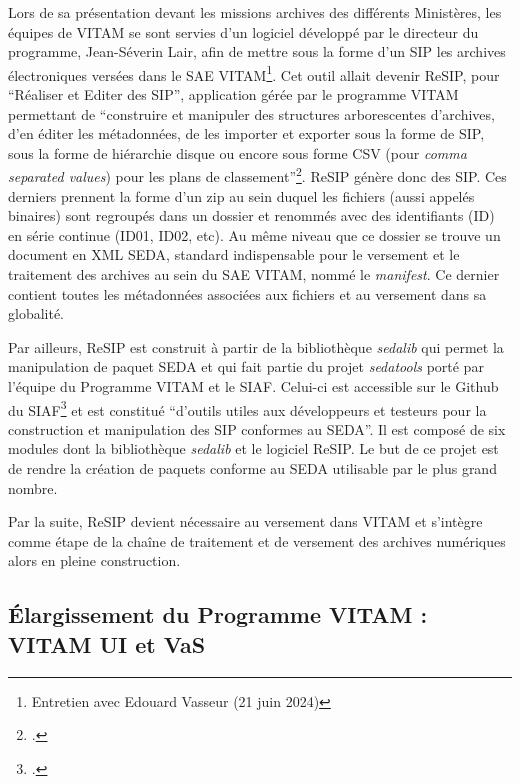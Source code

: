 Lors de sa présentation devant les missions archives des différents Ministères, les équipes de \gls{VITAM} se sont servies d’un logiciel développé par le directeur du programme, Jean-Séverin Lair, afin de mettre sous la forme d’un \gls{SIP} les archives électroniques versées dans le \gls{SAE} \gls{VITAM}\footnote{Entretien avec Edouard Vasseur (21 juin 2024)}. Cet outil allait devenir ReSIP, pour \enquote{Réaliser et Editer des \gls{SIP}}, application gérée par le programme \gls{VITAM} permettant de \enquote{construire et manipuler des structures arborescentes d’archives, d’en éditer les métadonnées, de les importer et exporter sous la forme de \gls{SIP}, sous la forme de hiérarchie disque ou encore sous forme CSV (pour \textit{comma separated values}) pour les plans de classement}\footcite{noauthor_resip_nodate}. ReSIP génère donc des \gls{SIP}. Ces derniers prennent la forme d’un zip au sein duquel les fichiers (aussi appelés binaires) sont regroupés dans un dossier et renommés avec des identifiants (ID) en série continue (ID01, ID02, etc). Au même niveau que ce dossier se trouve un document en \gls{XML} \gls{SEDA}, standard indispensable pour le versement et le traitement des archives au sein du \gls{SAE} \gls{VITAM}, nommé le \textit{\gls{manifest}}. Ce dernier contient toutes les métadonnées associées aux fichiers et au versement dans sa globalité.


Par ailleurs, ReSIP est construit à partir de la bibliothèque \textit{sedalib} qui permet la manipulation de paquet \gls{SEDA} et qui fait partie du projet \textit{sedatools} porté par l’équipe du Programme \gls{VITAM} et le SIAF. Celui-ci est accessible sur le Github du SIAF\footcite{noauthor_programmevitamsedatools_2024} et est constitué \enquote{d’outils utiles aux développeurs et testeurs pour la construction et manipulation des \gls{SIP} conformes au \gls{SEDA}}. Il est composé de six modules dont la bibliothèque \textit{sedalib} et le logiciel ReSIP. Le but de ce projet est de rendre la création de paquets conforme au \gls{SEDA} utilisable par le plus grand nombre.


Par la suite, ReSIP devient nécessaire au versement dans \gls{VITAM} et s’intègre comme étape de la chaîne de traitement et de versement des archives numériques alors en pleine construction.

\subsection{Élargissement du Programme VITAM : VITAM UI et VaS}

